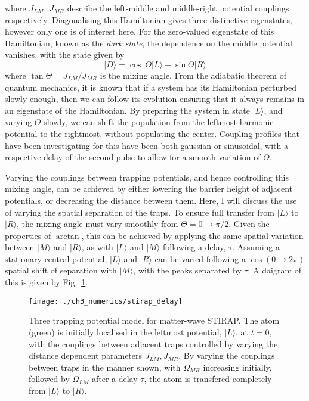 where $J_{LM},~J_{MR}$ describe the left-middle and middle-right potential couplings respectively. Diagonalising this Hamiltonian gives three distinctive eigenstates, however only one is of interest here. For the zero-valued eigenstate of this Hamiltonian, known as the \textit{dark state}, the dependence on the middle potential vanishes, with the state given by
\begin{equation}
 | D \rangle = \cos\ \Theta| L \rangle - \sin \Theta | R \rangle
\end{equation}
where $\tan \Theta=J_{LM}/J_{MR}$ is the mixing angle. From the adiabatic theorem of quantum mechanics, it is known that if a system has its Hamiltonian perturbed slowly enough, then we can follow its evolution ensuring that it always remains in an eigenstate of the Hamiltonian. By preparing the system in state $| L \rangle$, and varying $\Theta$ slowly, we can shift the population from the leftmost harmonic potential to the rightmost, without populating the center. Coupling profiles that have been investigating for this have been both gaussian \cite{bergman review} or sinusoidal, with a respective delay of the second pulse to allow for a smooth variation of $\Theta$.

Varying the couplings between trapping potentials, and hence controlling this mixing angle, can be achieved by either lowering the barrier height of adjacent potentials, or decreasing the distance between them. Here, I will discuss the use of varying the spatial separation of the traps. To ensure full transfer from $|L \rangle$ to $| R \rangle$, the mixing angle must vary smoothly from $\Theta = 0 \rightarrow \pi/2$. Given the properties of $\arctan$, this can be achieved by applying the same spatial variation between $|M \rangle$ and $| R\rangle$, as with $|L \rangle$ and $| M\rangle$ following a delay, $\tau$. Assuming a stationary central potential, $| L \rangle$ and $| R\rangle$ can be varied following a $\cos(0 \rightarrow 2\pi)$ spatial shift of separation with $| M \rangle$, with the peaks separated by $\tau$. A daigram of this is given by Fig.~\ref{fig:ch3_stirap}.


\begin{figure}
    \centering
    \texttt{[image: ./ch3\_numerics/stirap\_delay]}
    \caption{Three trapping potential model for matter-wave STIRAP. The atom (green) is initially localised in the leftmost potential, $|L\rangle$, at $t=0$, with the couplings between adjacent traps controlled by varying the distance dependent parameters $J_{LM},J_{MR}$. By varying the couplings between traps in the manner shown, with $\Omega_{MR}$ increasing initially, followed by $\Omega_{LM}$ after a delay $\tau$, the atom is transfered completely from $|L\rangle$ to $| R \rangle$.}
    \label{fig:ch3_stirap}
\end{figure}

